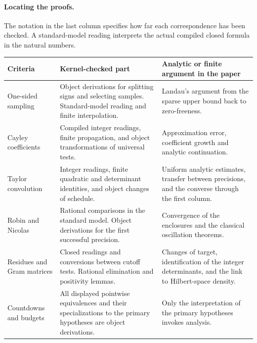 \paragraph{Locating the proofs.}
The notation in the last column specifies how far each correspondence has been checked. A standard-model reading interprets the actual compiled closed formula in the natural numbers.
\begin{center}\small
\begin{tabular}{@{}>{\raggedright\arraybackslash}p{.23\linewidth}>{\raggedright\arraybackslash}p{.35\linewidth}>{\raggedright\arraybackslash}p{.35\linewidth}@{}}\toprule
Criteria & Kernel-checked part & Analytic or finite argument in the paper\\\midrule
One-sided sampling & Object derivations for splitting signs and selecting samples. Standard-model reading and finite interpolation. & Landau's argument from the sparse upper bound back to zero-freeness.\\[2pt]
Cayley coefficients & Compiled integer readings, finite propagation, and object transformations of universal tests. & Approximation error, coefficient growth and analytic continuation.\\[2pt]
Taylor convolution & Integer readings, finite quadratic and determinant identities, and object changes of schedule. & Uniform analytic estimates, transfer between precisions, and the converse through the first column.\\[2pt]
Robin and Nicolas & Rational comparisons in the standard model. Object derivations for the first successful precision. & Convergence of the enclosures and the classical oscillation theorems.\\[2pt]
Residues and Gram matrices & Closed readings and conversions between cutoff tests. Rational elimination and positivity lemmas. & Changes of target, identification of the integer determinants, and the link to Hilbert-space density.\\[2pt]
Countdowns and budgets & All displayed pointwise equivalences and their specializations to the primary hypotheses are object derivations. & Only the interpretation of the primary hypotheses invokes analysis.\\\bottomrule
\end{tabular}
\end{center}

